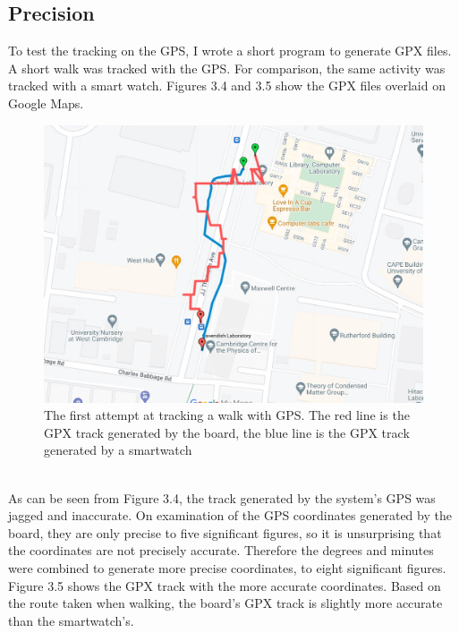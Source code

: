 \documentclass[12pt,a4paper]{report}
\begin{document}
\subsection{Precision}
To test the tracking on the GPS, I wrote a short program to generate GPX files. A short walk was tracked with the GPS. For comparison, the same activity was tracked with a smart watch. Figures 3.4 and 3.5 show the GPX files overlaid on Google Maps. \\
\begin{figure}[h]
\begin{center}
\includegraphics[scale=0.4]{gps1.jpg}
\end{center}
\caption{The first attempt at tracking a walk with GPS. The red line is the GPX track generated by the board, the blue line is the GPX track generated by a smartwatch \cite{googlemapsgeneral}}
\end{figure}\\ 
As can be seen from Figure 3.4, the track generated by the system's GPS was jagged and inaccurate. On examination of the GPS coordinates generated by the board, they are only precise to five significant figures, so it is unsurprising that the coordinates are not precisely accurate. Therefore the degrees and minutes were combined to generate more precise coordinates, to eight significant figures. Figure 3.5 shows the GPX track with the more accurate coordinates. Based on the route taken when walking, the board's GPX track is slightly more accurate than the smartwatch's. 
\end{document}

